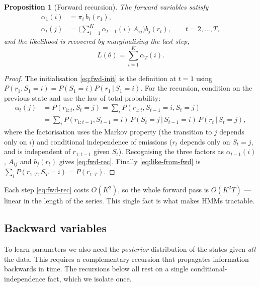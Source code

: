 \documentclass[11pt]{article}
\newcommand{\given}{\,\vert\,}
\newcommand{\state}{S}
\newcommand{\obs}{r}
\newcommand{\nstate}{K}
\newcommand{\fwd}{\alpha}
\theoremstyle{plain}
\newtheorem{proposition}{Proposition}
\theoremstyle{definition}
\theoremstyle{remark}
\begin{document}
\begin{proposition}[Forward recursion]\label{prop:fwd}
The forward variables satisfy
\begin{align}
  \fwd_1(i) &= \pi_i\, b_i(\obs_1), \label{eq:fwd-init}\\
  \fwd_t(j) &= \Big(\sum_{i=1}^{\nstate} \fwd_{t-1}(i)\, A_{ij}\Big) b_j(\obs_t),
              \qquad t=2,\dots,T,\label{eq:fwd-rec}
\end{align}
and the likelihood is recovered by marginalising the last step,
\begin{equation}\label{eq:like-from-fwd}
  L(\theta) = \sum_{i=1}^{\nstate} \fwd_T(i).
\end{equation}
\end{proposition}

\begin{proof}
The initialisation \eqref{eq:fwd-init} is the definition at $t=1$ using
$P(\obs_1,\state_1=i)=P(\state_1=i)P(\obs_1\given\state_1=i)$. For the recursion,
condition on the previous state and use the law of total probability:
\begin{align*}
  \fwd_t(j)
  &= P(\obs_{1:t}, \state_t=j)
   = \sum_{i} P(\obs_{1:t}, \state_{t-1}=i, \state_t=j)\\
  &= \sum_{i} P(\obs_{1:t-1},\state_{t-1}=i)\,
             P(\state_t=j\given \state_{t-1}=i)\,
             P(\obs_t\given \state_t=j),
\end{align*}
where the factorisation uses the Markov property (the transition to $j$ depends
only on $i$) and conditional independence of emissions ($\obs_t$ depends only on
$\state_t=j$, and is independent of $\obs_{1:t-1}$ given $\state_t$). Recognising
the three factors as $\fwd_{t-1}(i)$, $A_{ij}$ and $b_j(\obs_t)$ gives
\eqref{eq:fwd-rec}. Finally \eqref{eq:like-from-fwd} is
$\sum_i P(\obs_{1:T},\state_T=i)=P(\obs_{1:T})$.
\end{proof}

Each step \eqref{eq:fwd-rec} costs $O(\nstate^2)$, so the whole forward pass is
$O(\nstate^2 T)$ --- linear in the length of the series. This single fact is what
makes HMMs tractable.

\subsection{Backward variables}

To learn parameters we also need the \emph{posterior} distribution of the states
given \emph{all} the data. This requires a complementary recursion that
propagates information backwards in time. The recursions below all rest on a
single conditional-independence fact, which we isolate once.
\end{document}
